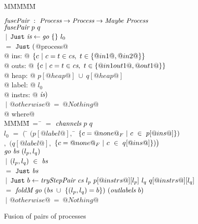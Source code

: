 
\begin{figure}

\begin{tabbing}
M\=M\=M\=M\=M\kill

$\textit{fusePair} ~:~ \textit{Process} \to \textit{Process} \to  \textit{Maybe}~\textit{Process}$ \\
$\textit{fusePair}~p~q$ \\
\> $~|$ \> $\texttt{Just}~ \textit{is} \gets \textit{go}~\{  \}~l_0$ \\
\> $=$ \> $\texttt{Just}~ ($@process@ \\
@             ins: @ $\{ c~|~c=t \in \textit{cs},~t \in \{ @in1@,@in2@ \} \} $ \\
@            outs: @ $\{ c~|~c=t \in \textit{cs},~t \in \{ @in1out1@,@out1@ \} \} $ \\
@            heap: @ $p[@heap@]~\cup~q[@heap@]$ \\
@           label: @ $l_0$ \\
@          instrs: @ $\textit{is})$ \\
\> $~|$ \> $@otherwise@~=~@Nothing@$ \\
@ where@ \\
M\=MM\=M\=~=~\=\kill
 \> \cs \> $=$ \> $\textit{channels}~p~q$ \\[0.5ex]

 \> $l_0$  \> $=$ \> $
      \big($ \= $(p[@label@],$ \= $\{ c=@none@_F~|~c~\in~p[@ins@] \})$
\\ \> \> \>$,$ \> $(q[@label@],$ \> $\{ c=@none@_F~|~c~\in~q[@ins@] \})
      \big)$ \\[0.5ex]

 \> $\textit{go}~\textit{bs}~(l_p,l_q)$ \\
 \> \> $~|$ \> $(l_p,l_q)~\in~\textit{bs}$ \\
 \> \> $=$ \> $\texttt{Just}~\textit{bs}$ \\[0.5ex]
 \> \> $~|$ \> $\texttt{Just}~ b \gets \textit{tryStepPair}~\textit{cs}~l_p~p[@instrs@][l_p]~l_q~q[@instrs@][l_q]$ \\ 
 \> \> $=$ \> $\textit{foldM}~\textit{go}~(\textit{bs}~\cup~\{ (l_p,l_q)=b \})~(\textit{outlabels}~b)$ \\[0.5ex]
 \> \> $~|$ \> $@otherwise@~=~@Nothing@$
\end{tabbing}

\caption{Fusion of pairs of processes}


\label{fig:Fusion:Def:Top}
\end{figure}
